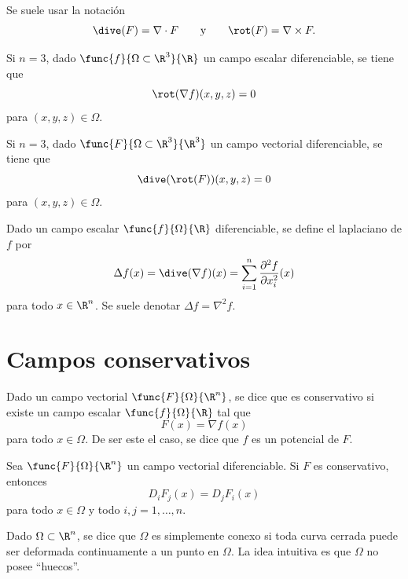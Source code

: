 \documentclass[a4,11pt]{aleph-notas}
\begin{document}
\begin{advertencia}
    Se suele usar la notación
    \[
        \dive(F) = \nabla\cdot F
        \qquad\text{y}\qquad
        \rot(F) = \nabla \times F.
    \]
\end{advertencia}

\begin{prop}
    Si $n=3$, dado $\func{f}{\Omega\subset\R^3}{\R}$ un campo escalar diferenciable, se tiene que
    \[
        \rot(\nabla f)(x,y,z)=0
    \]
    para $(x,y,z)\in \Omega$.
\end{prop}

\begin{prop}
    Si $n=3$, dado $\func{F}{\Omega\subset\R^3}{\R^3}$ un campo vectorial diferenciable, se tiene que
    \[
        \dive(\rot(F))(x,y,z)=0
    \]
    para $(x,y,z)\in \Omega$.
\end{prop}

\begin{defi}[Laplaciano]
    Dado un campo escalar $\func{f}{\Omega}{\R}$ diferenciable, se define el laplaciano de $f$ por
    \[
        \Delta f (x) = \dive(\nabla f)(x) = \sum_{i=1}^n \frac{\partial^2 f}{\partial x_i^2}(x)
    \]
    para todo $x\in\R^n$. Se suele denotar $\Delta f = \nabla^2 f$.
\end{defi}

\section{Campos conservativos}

\begin{defi}
    Dado un campo vectorial $\func{F}{\Omega}{\R^n}$, se dice que es conservativo si existe un campo escalar $\func{f}{\Omega}{\R}$ tal que
    \[
        F(x)=\nabla f(x)
    \]
    para todo $x\in \Omega$. De ser este el caso, se dice que $f$ es un potencial de $F$.
\end{defi}

\begin{prop}
    Sea $\func{F}{\Omega}{\R^n}$ un campo vectorial diferenciable. Si $F$ es conservativo, entonces
    \[
        D_i F_j(x) = D_j F_i(x)
    \]
    para todo $x\in \Omega$ y todo $i,j=1,\ldots,n$.
\end{prop}

\begin{defi}
    Dado $\Omega\subset \R^n$, se dice que $\Omega$ es simplemente conexo si toda curva cerrada puede ser deformada continuamente a un punto en $\Omega$. La idea intuitiva es que $\Omega$ no posee ``huecos''.
\end{defi}
\end{document}
